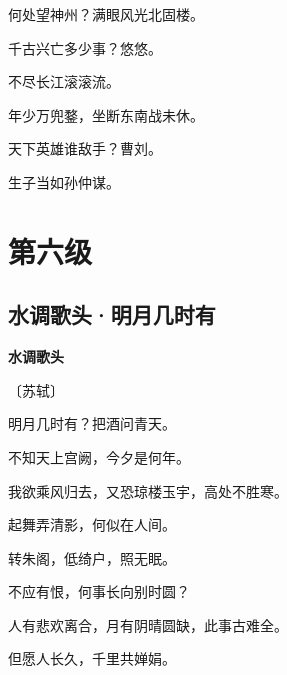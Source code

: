 \documentclass[12pt,UTF-8,openany,fontset=none]{ctexbook}
\begin{document}
    \vspace{18pt}  %

\begin{center}
    \begin{Large}

        何处望神州？满眼风光北固楼。

        千古兴亡多少事？悠悠。

        不尽长江滚滚流。

        \vspace{18pt}  %

        年少万兜鍪，坐断东南战未休。

        天下英雄谁敌手？曹刘。

        生子当如孙仲谋。

    \end{Large}

\end{center}

\vspace{8pt}
\clearpage

\chapter{第六级}
\clearpage

\section{水调歌头·明月几时有}


\begin{center}
    {\bfseries 水调歌头}

    \vspace{18pt}

    \begin{large}\xuwen
        〔苏轼〕
    \end{large}

\end{center}

    \vspace{18pt}  %

\begin{center}
    \begin{Large}

        明月几时有？把酒问青天。

        不知天上宫阙，今夕是何年。

        我欲乘风归去，又恐琼楼玉宇，高处不胜寒。

        起舞弄清影，何似在人间。

        \vspace{18pt}  %

        转朱阁，低绮户，照无眠。

        不应有恨，何事长向别时圆？

        人有悲欢离合，月有阴晴圆缺，此事古难全。

        但愿人长久，千里共婵娟。

    \end{Large}

\end{center}
\end{document}
